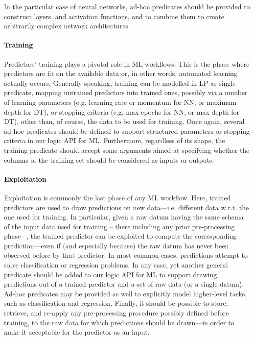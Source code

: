 \documentclass[12pt,a4paper,openright,twoside]{book}
\begin{document}
In the particular case of neural networks, ad-hoc predicates should be provided to construct layers, and activation functions, and to combine them to create arbitrarily complex network architectures.

\paragraph{Training}

Predictors' training plays a pivotal role in ML workflows.
%
This is the phase where predictors are fit on the available data or, in other words, automated learning actually occurs.
%
Generally speaking, training can be modelled in LP as single predicate, mapping untrained predictors into trained ones, possibly via a number of learning parameters (e.g. learning rate or momentum for NN, or maximum depth for DT), or stopping criteria (e.g. max epochs for NN, or max depth for DT), other than, of course, the data to be used for training.
%
Once again, several ad-hoc predicates should be defined to support structured parameters or stopping criteria in our logic API for ML.
%
Furthermore, regardless of its shape, the training predicate should accept some arguments aimed at specifying whether the columns of the training set should be considered as inputs or outputs.

\paragraph{Exploitation}

Exploitation is commonly the last phase of any ML workflow.
%
Here, trained predictors are used to draw predictions on new data---i.e. different data w.r.t. the one used for training.
%
In particular, given a raw datum having the same schema of the input data used for training -- there including any prior pre-processing phase --, the trained predictor can be exploited to compute the corresponding prediction---even if (and especially because) the raw datum has never been observed before by that predictor.
%
In most common cases, predictions attempt to solve classification or regression problems.
%
In any case, yet another general predicate should be added to our logic API for ML to support drawing predictions out of a trained predictor and a set of raw data (or a single datum).
%
Ad-hoc predicates may be provided as well to explicitly model higher-level tasks, such as classification and regression.
%
Finally, it should be possible to store, retrieve, and re-apply any pre-processing procedure possibly defined before training, to the raw data for which predictions should be drawn---in order to make it acceptable for the predictor as an input.
\end{document}
